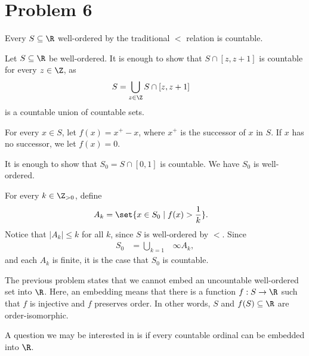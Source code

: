 \documentclass[10pt]{mypackage}
\begin{document}
\section{Problem 6}%
\begin{problem}
  Every $S\subseteq \R$ well-ordered by the traditional $<$ relation is countable.
\end{problem}
\begin{solution}
  Let $S\subseteq \R$ be well-ordered. It is enough to show that $S\cap [z,z+1]$ is countable for every $z\in \Z$, as
  \begin{align*}
    S &= \bigcup_{z\in \Z}S\cap \left[z,z+1\right]
  \end{align*}
  is a countable union of countable sets.\newline

  For every $x\in S$, let $f(x) = x^{+} - x$, where $x^{+}$ is the successor of $x$ in $S$. If $x$ has no successor, we let $f(x) = 0$.\newline

  It is enough to show that $S_0 = S\cap [0,1]$ is countable. We have $S_0$ is well-ordered.\newline

  For every $k\in \Z_{>0}$, define
  \begin{align*}
    A_k &= \set{x\in S_0\mid f(x) > \frac{1}{k}}.
  \end{align*}
  Notice that $\left\vert A_k \right\vert \leq k$ for all $k$, since $S$ is well-ordered by $<$. Since
  \begin{align*}
    S_0 &= \bigcup_{k=1}&{\infty}A_k,
  \end{align*}
  and each $A_k$ is finite, it is the case that $S_0$ is countable.
\end{solution}
\begin{remark}
  The previous problem states that we cannot embed an uncountable well-ordered set into $\R$. Here, an embedding means that there is a function $f: S\rightarrow \R$ such that $f$ is injective and $f$ preserves order. In other words, $S$ and $f(S)\subseteq \R$ are order-isomorphic.\newline

  A question we may be interested in is if every countable ordinal can be embedded into $\R$.
\end{remark}
\end{document}
